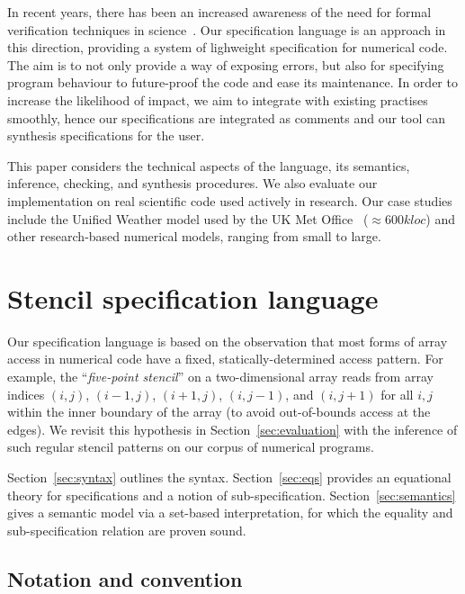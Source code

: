 \documentclass[9pt]{sigplanconf}
\theoremstyle{definition}
\begin{document}
In recent years, there has been an increased awareness
of the need for formal verification techniques in
science~\cite{post2005computational,oberkampf2010verification,orchard2014computational}.
Our specification language is an approach in this direction, providing
a system of lighweight specification for numerical code.
The aim is to not only provide a way of exposing errors, but also
for specifying program behaviour to future-proof the code and ease
its maintenance. In order to increase the likelihood of impact, we aim
to integrate with existing practises smoothly, hence our
specifications are integrated as comments and our tool can synthesis
specifications for the user.

This paper considers the technical aspects of the language,
its semantics, inference, checking, and synthesis procedures.
We also evaluate our implementation on real scientific code 
used actively in research. Our case studies include the Unified Weather 
model used by the UK Met Office~\cite{um-website} ($\approx{}600\textit{kloc}$) and other
research-based numerical models, ranging from small to large. 

\section{Stencil specification language}
\label{sec:lang}

Our specification language is based on the observation
that most forms of array access in numerical code have
a fixed, statically-determined access pattern. For example, the
``\emph{five-point stencil}'' on a two-dimensional array reads from array
indices $(i, j)$, $(i-1, j)$, $(i+1, j)$, $(i, j-1)$, and $(i, j+1)$
for all $i, j$ within the inner boundary of the array (to avoid
out-of-bounds access at the edges). We revisit this hypothesis
in Section~\ref{sec:evaluation} with the inference of
such regular stencil patterns on our corpus of numerical programs. 

Section~\ref{sec:syntax} outlines the syntax.
 Section~\ref{sec:eqs} provides an equational
theory for specifications and a notion of
sub-specification.  Section~\ref{sec:semantics}
gives a semantic model via a set-based interpretation, for which the
equality and sub-specification relation are proven sound.

\subsection{Notation and convention}
\label{sec:notation}
\end{document}
